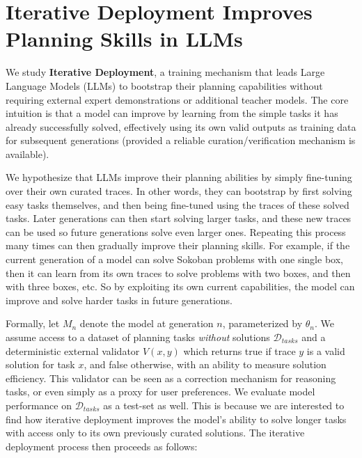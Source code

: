 \section{Iterative Deployment Improves Planning Skills in LLMs}
\label{sec:mechanism}

We study \textbf{Iterative Deployment}, a training mechanism that leads Large Language Models (LLMs) to bootstrap their planning capabilities without requiring external expert demonstrations or additional teacher models. The core intuition is that a model can improve by learning from the simple tasks it has already successfully solved, effectively using its own valid outputs as training data for subsequent generations (provided a reliable curation/verification mechanism is available).

We hypothesize that LLMs improve their planning abilities by simply fine-tuning
over their own curated traces. In other words, they can bootstrap by first
solving easy tasks themselves, and then being fine-tuned using the traces of
these solved tasks. Later generations can then start solving larger tasks, and
these new traces can be used so future generations solve even larger
ones. Repeating this process many times can then gradually improve their planning skills. For
example, if the current generation of a model can solve Sokoban problems with
one single box, then it can learn from its own traces to solve problems with two
boxes, and then with three boxes, etc. So by exploiting its own current
capabilities, the model can improve and solve harder tasks in future
generations.

Formally, let $M_n$ denote the model at generation $n$, parameterized by $\theta_n$. We assume access to a dataset of planning tasks \emph{without} solutions $\mathcal{D}_{tasks}$ and a deterministic external validator $V(x, y)$ which returns true if trace $y$ is a valid solution for task $x$, and false otherwise, with an ability to measure solution efficiency. This validator can be seen as a correction mechanism for reasoning tasks, or even simply as a proxy for user preferences. We evaluate model performance on  $\mathcal{D}_{tasks}$ as a test-set as well. This is because we are interested to find how iterative deployment improves the model's ability to solve longer tasks with access only to its own previously curated solutions. The iterative deployment process then proceeds as follows:

